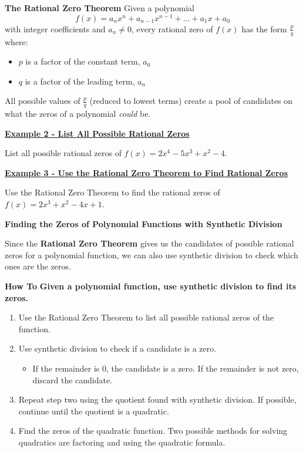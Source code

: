 \documentclass[12pt]{book}
\newcommand{\D}{\displaystyle}
\begin{document}
\begin{boxR}
  \textbf{The Rational Zero Theorem}
    \vspace{1mm}
    \hline
    \vspace{2mm}
Given a polynomial $$\D f(x)=a_nx^n + a_{n-1}x^{n-1} + \ldots + a_1x+a_0$$ with integer coefficients and $a_n \neq 0$, every rational zero of $f(x)$ has the form $\D \frac{p}{q}$ where:
\begin{itemize}
    \item $p$ is a factor of the constant term, $a_0$
    \item $q$ is a factor of the leading term, $a_n$
\end{itemize}
 All possible values of $\frac{p}{q}$ (reduced to lowest terms) create a pool of candidates on what the zeros of a polynomial \textit{could} be.
\end{boxR}


\underline{\textbf{Example 2 - List All Possible Rational Zeros}}

List all possible rational zeros of $f(x)=2x^4-5x^3+x^2-4$.


\newpage

\underline{\textbf{Example 3 - Use the Rational Zero Theorem to Find Rational Zeros}}

Use the Rational Zero Theorem to find the rational zeros of $f(x) = 2x^3 + x^2 - 4x+1$. 



\newpage
{\large \textbf{Finding the Zeros of Polynomial Functions with Synthetic Division}}

Since the \textbf{Rational Zero Theorem} gives us the candidates of possible rational zeros for a polynomial function, we can also use synthetic division to check which ones are the zeros.

\begin{boxR}
  \textbf{  How To}
  \vspace{1mm}
  \hline
  \vspace{2mm}
\textbf{Given a polynomial function, use synthetic division to find its zeros.}
\begin{enumerate}
    \item Use the Rational Zero Theorem to list all possible rational zeros of the function.
    \item Use synthetic division to check if a candidate is a zero.
        \begin{itemize}
             \item  If the remainder is $0$, the candidate is a zero. If the remainder is not zero, discard the candidate.
         \end{itemize}
    \item Repeat step two using the quotient found with synthetic division. If possible, continue until the quotient is a quadratic.
    \item Find the zeros of the quadratic function. Two possible methods for solving quadratics are factoring and using the quadratic formula.
\end{enumerate}
\end{boxR}
\end{document}
